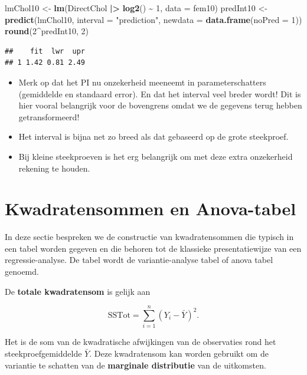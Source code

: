 \documentclass[
  12pt,dutch]{book}
\newenvironment{Shaded}{\begin{snugshade}}{\end{snugshade}}
\newcommand{\AttributeTok}[1]{\textcolor[rgb]{0.13,0.29,0.53}{#1}}
\newcommand{\DecValTok}[1]{\textcolor[rgb]{0.00,0.00,0.81}{#1}}
\newcommand{\FunctionTok}[1]{\textcolor[rgb]{0.13,0.29,0.53}{\textbf{#1}}}
\newcommand{\NormalTok}[1]{#1}
\newcommand{\OtherTok}[1]{\textcolor[rgb]{0.56,0.35,0.01}{#1}}
\newcommand{\SpecialCharTok}[1]{\textcolor[rgb]{0.81,0.36,0.00}{\textbf{#1}}}
\newcommand{\StringTok}[1]{\textcolor[rgb]{0.31,0.60,0.02}{#1}}
\theoremstyle{definition}
\theoremstyle{definition}
\theoremstyle{definition}
\theoremstyle{definition}
\theoremstyle{remark}
\begin{document}
\begin{Shaded}
\begin{Highlighting}[]
\NormalTok{lmChol10 }\OtherTok{\textless{}{-}} \FunctionTok{lm}\NormalTok{(DirectChol }\SpecialCharTok{|\textgreater{}}
    \FunctionTok{log2}\NormalTok{() }\SpecialCharTok{\textasciitilde{}} \DecValTok{1}\NormalTok{, }\AttributeTok{data =}\NormalTok{ fem10)}
\NormalTok{predInt10 }\OtherTok{\textless{}{-}} \FunctionTok{predict}\NormalTok{(lmChol10, }\AttributeTok{interval =} \StringTok{"prediction"}\NormalTok{,}
    \AttributeTok{newdata =} \FunctionTok{data.frame}\NormalTok{(}\AttributeTok{noPred =} \DecValTok{1}\NormalTok{))}
\FunctionTok{round}\NormalTok{(}\DecValTok{2}\SpecialCharTok{\^{}}\NormalTok{predInt10, }\DecValTok{2}\NormalTok{)}
\end{Highlighting}
\end{Shaded}

\begin{verbatim}
##    fit  lwr  upr
## 1 1.42 0.81 2.49
\end{verbatim}

\begin{itemize}
\item
  Merk op dat het PI nu onzekerheid meeneemt in parameterschatters (gemiddelde en standaard error).
  En dat het interval veel breder wordt! Dit is hier vooral belangrijk voor de bovengrens omdat we de gegevens terug hebben getransformeerd!
\item
  Het interval is bijna net zo breed als dat gebaseerd op de grote steekproef.
\item
  Bij kleine steekproeven is het erg belangrijk om met deze extra onzekerheid rekening te houden.
\end{itemize}

\section{Kwadratensommen en Anova-tabel}\label{sec:linAnova}

In deze sectie bespreken we de constructie van kwadratensommen die typisch in een tabel worden gegeven en die behoren tot de klassieke presentatiewijze van een regressie-analyse.
De tabel wordt de variantie-analyse tabel of anova tabel genoemd.

De \textbf{totale kwadratensom} is gelijk aan

\[\text{SSTot} = \sum_{i=1}^n (Y_i-\bar{Y})^2.\]

Het is de som van de kwadratische afwijkingen van de observaties rond het steekproefgemiddelde \(\bar Y\).
Deze kwadratensom kan worden gebruikt om de variantie te schatten van de \textbf{marginale distributie} van de uitkomsten.
\end{document}
